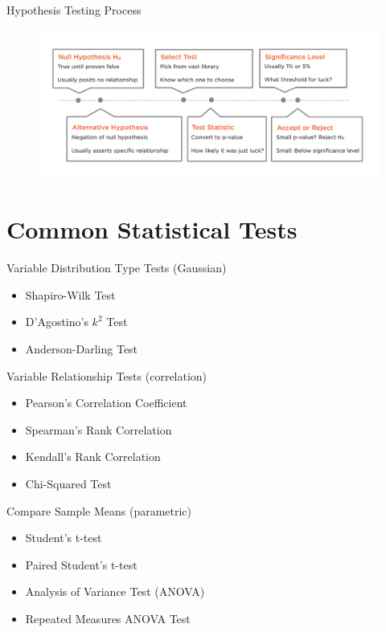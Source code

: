 \begin{frame}[t]{Hypothesis Testing Process}
	\begin{figure}	
	\includegraphics[width=12cm]{img/hypothesis}
	\end{figure}
\end{frame}


\section{Common Statistical Tests}
\begin{frame}[t]{Variable Distribution Type Tests (Gaussian)}
	\begin{itemize}	
		\item Shapiro-Wilk Test
		\item D’Agostino’s $k^{2}$ Test
		\item Anderson-Darling Test
	\end{itemize}
\end{frame}

\begin{frame}[t]{Variable Relationship Tests (correlation)}
	\begin{itemize}	
		\item Pearson’s Correlation Coefficient
		\item Spearman’s Rank Correlation
		\item Kendall’s Rank Correlation
		\item Chi-Squared Test
	\end{itemize}
\end{frame}

\begin{frame}[t]{Compare Sample Means (parametric)}
	\begin{itemize}	
		\item Student’s t-test
		\item Paired Student’s t-test
		\item Analysis of Variance Test (ANOVA)
		\item Repeated Measures ANOVA Test
	\end{itemize}
\end{frame}


